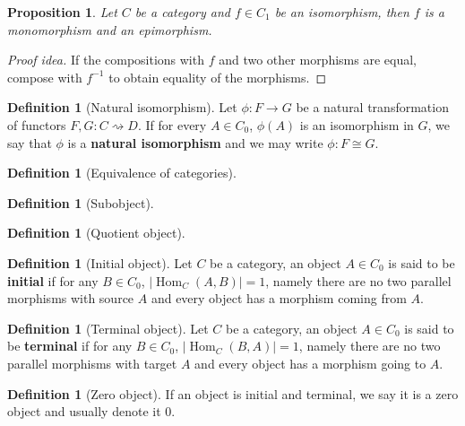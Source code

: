 \documentclass{scrartcl}
\newtheorem{prop}[thm]{Proposition}
\theoremstyle{definition}
\newtheorem{defn}[thm]{Definition}
\theoremstyle{remark}
\DeclareMathOperator{\Hom}{Hom}
\begin{document}
\begin{prop}
    Let $C$ be a category and $f \in C_1$ be an isomorphism, then $f$ is a monomorphism and an epimorphism.
\end{prop}
\begin{proof}[Proof idea]
    If the compositions with $f$ and two other morphisms are equal, compose with $f^{-1}$ to obtain equality of the morphisms.
\end{proof}
\begin{defn}[Natural isomorphism]
    Let $\phi: F\rightarrow G$ be a natural transformation of functors $F,G: C \rightsquigarrow D$. If for every $A \in C_0$, $\phi(A)$ is an isomorphism in $G$, we say that $\phi$ is a \textbf{natural isomorphism} and we may write $\phi: F \cong G$.
\end{defn}
\begin{defn}[Equivalence of categories]
\end{defn}
\begin{defn}[Subobject]
\end{defn}
\begin{defn}[Quotient object]
\end{defn}
\begin{defn}[Initial object]
    Let $C$ be a category, an object $A \in C_0$ is said to be \textbf{initial} if for any $B \in C_0$, $|\Hom_C(A,B)| = 1$, namely there are no two parallel morphisms with source $A$ and every object has a morphism coming from $A$.
\end{defn}
\begin{defn}[Terminal object]
    Let $C$ be a category, an object $A \in C_0$ is said to be \textbf{terminal} if for any $B \in C_0$, $|\Hom_C(B,A)| = 1$, namely there are no two parallel morphisms with target $A$ and every object has a morphism going to $A$.
\end{defn}
\begin{defn}[Zero object]
    If an object is initial and terminal, we say it is a zero object and usually denote it $0$.
\end{defn}
\end{document}
